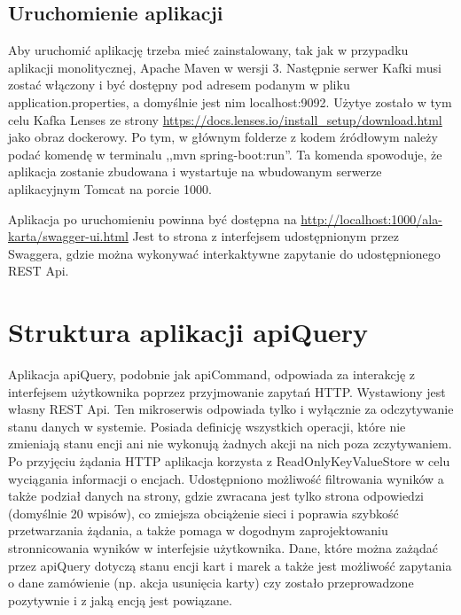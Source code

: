 \subsection{Uruchomienie aplikacji}
Aby uruchomić aplikację trzeba mieć zainstalowany, tak jak w przypadku aplikacji monolitycznej, Apache Maven w wersji 3.
Następnie serwer Kafki musi zostać włączony i być dostępny pod adresem podanym w pliku application.properties, a domyślnie jest nim localhost:9092. Użytye zostało w tym celu Kafka Lenses ze strony \url{https://docs.lenses.io/install_setup/download.html} jako obraz dockerowy.
Po tym, w głównym folderze z kodem źródłowym należy podać komendę w terminalu ,,mvn spring-boot:run''. Ta komenda spowoduje, że aplikacja zostanie zbudowana i wystartuje na wbudowanym serwerze aplikacyjnym Tomcat na porcie 1000.

Aplikacja po uruchomieniu powinna być dostępna na \url{http://localhost:1000/ala-karta/swagger-ui.html}
Jest to strona z interfejsem udostępnionym przez Swaggera, gdzie można wykonywać interkaktywne zapytanie do udostępnionego REST Api.


\section{Struktura aplikacji apiQuery}
Aplikacja apiQuery, podobnie jak apiCommand, odpowiada za interakcję z interfejsem użytkownika poprzez przyjmowanie zapytań HTTP. Wystawiony jest własny REST Api. Ten mikroserwis odpowiada tylko i wyłącznie za odczytywanie stanu danych w systemie. Posiada definicję wszystkich operacji, które nie zmieniają stanu encji ani nie wykonują żadnych akcji na nich poza zczytywaniem. Po przyjęciu żądania HTTP aplikacja korzysta z ReadOnlyKeyValueStore w celu wyciągania informacji o encjach. Udostępniono możliwość filtrowania wyników a także podział danych na strony, gdzie zwracana jest tylko strona odpowiedzi (domyślnie 20 wpisów), co zmiejsza obciążenie sieci i poprawia szybkość przetwarzania żądania, a także pomaga w dogodnym zaprojektowaniu stronnicowania wyników w interfejsie użytkownika. Dane, które można zażądać przez apiQuery dotyczą stanu encji kart i marek a także jest możliwość zapytania o dane zamówienie (np. akcja usunięcia karty) czy zostało przeprowadzone pozytywnie i z jaką encją jest powiązane.

